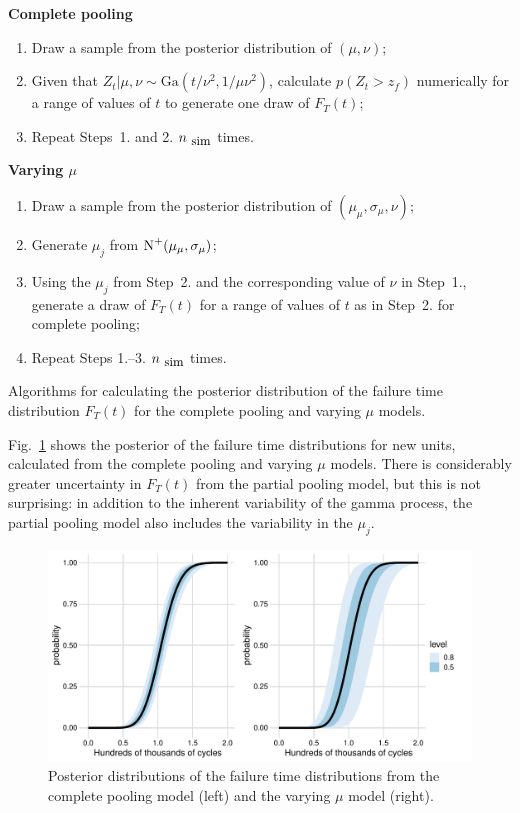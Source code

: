 \documentclass{article}
\begin{document}
\begin{table}
\centering
\begin{multicols}{2}

\textbf{Complete pooling}
\begin{enumerate}
    \item Draw a sample from the posterior distribution of $(\mu, \nu)$;
    \item Given that $Z_t|\mu, \nu \sim \mbox{Ga}(t/\nu^2, 1/\mu \nu^2)$, calculate $p(Z_t > z_f)$ numerically for a range of values of $t$ to generate one draw of $F_T(t)$;
    \item Repeat Steps~1. and 2. $n_{\hbox{\small{sim}}}$ times.
\end{enumerate}

\columnbreak

\textbf{Varying $\mu$}
\begin{enumerate}
    \item Draw a sample from the posterior distribution of $(\mu_\mu, \sigma_\mu, \nu)$;
    \item Generate $\mu_j$ from $\hbox{N}^{+}(\mu_\mu, \sigma_\mu)$;
    \item Using the $\mu_j$ from Step~2. and the corresponding value of $\nu$ in Step~1., generate a draw of $F_T(t)$ for a range of values of $t$ as in Step~2. for complete pooling;
    \item Repeat Steps 1.--3. $n_{\hbox{\small{sim}}}$ times.
\end{enumerate}

\end{multicols}
\caption{Algorithms for calculating the posterior distribution of the failure time distribution $F_T(t)$ for the complete pooling and varying $\mu$ models.}\label{fig:FT_algs}
\end{table}

Fig.~\ref{fig:FT_CP_VM_new} shows the posterior of the failure time distributions for new units, calculated from the complete pooling and varying $\mu$ models. There is considerably greater uncertainty in $F_T(t)$ from the partial pooling model, but this is not surprising: in addition to the inherent variability of the gamma process, the partial pooling model also includes the variability in the $\mu_j$. 

\begin{figure}[b]
    \centering
    \includegraphics[width=0.95\columnwidth]{../figures/FT_dist.pdf}
    \caption{Posterior distributions of the failure time distributions from the complete pooling model (left) and the varying $\mu$ model (right).}
    \label{fig:FT_CP_VM_new}
\end{figure}
\end{document}

